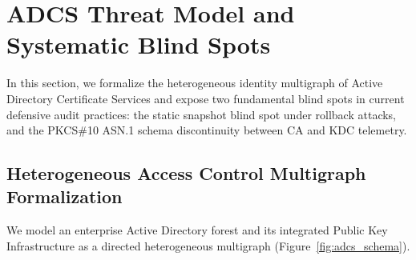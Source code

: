 \section{ADCS Threat Model and Systematic Blind Spots}
\label{sec:threat_model}

In this section, we formalize the heterogeneous identity multigraph of Active Directory Certificate Services and expose two fundamental blind spots in current defensive audit practices: the static snapshot blind spot under rollback attacks, and the PKCS\#10 ASN.1 schema discontinuity between CA and KDC telemetry.

\subsection{Heterogeneous Access Control Multigraph Formalization}
We model an enterprise Active Directory forest and its integrated Public Key Infrastructure as a directed heterogeneous multigraph (Figure~\ref{fig:adcs_schema}).

